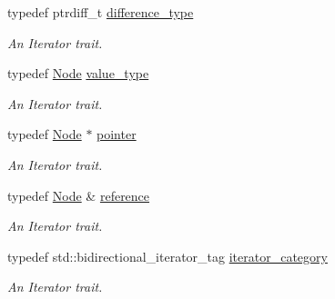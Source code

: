 \begin{DoxyCompactItemize}
\item 
\hypertarget{classphys_1_1xml_1_1NodeIterator_a0d7f40ce76602a5cc74616545d5c6076}{
typedef ptrdiff\_\-t \hyperlink{classphys_1_1xml_1_1NodeIterator_a0d7f40ce76602a5cc74616545d5c6076}{difference\_\-type}}
\label{da/d4f/classphys_1_1xml_1_1NodeIterator_a0d7f40ce76602a5cc74616545d5c6076}

\begin{DoxyCompactList}\small\item\em An Iterator trait. \item\end{DoxyCompactList}\item 
\hypertarget{classphys_1_1xml_1_1NodeIterator_a41a1bf31ea149a9a58d60c52e24234ab}{
typedef \hyperlink{classphys_1_1xml_1_1Node}{Node} \hyperlink{classphys_1_1xml_1_1NodeIterator_a41a1bf31ea149a9a58d60c52e24234ab}{value\_\-type}}
\label{da/d4f/classphys_1_1xml_1_1NodeIterator_a41a1bf31ea149a9a58d60c52e24234ab}

\begin{DoxyCompactList}\small\item\em An Iterator trait. \item\end{DoxyCompactList}\item 
\hypertarget{classphys_1_1xml_1_1NodeIterator_ad50b430887341d1cad3a655f5363c2e2}{
typedef \hyperlink{classphys_1_1xml_1_1Node}{Node} $\ast$ \hyperlink{classphys_1_1xml_1_1NodeIterator_ad50b430887341d1cad3a655f5363c2e2}{pointer}}
\label{da/d4f/classphys_1_1xml_1_1NodeIterator_ad50b430887341d1cad3a655f5363c2e2}

\begin{DoxyCompactList}\small\item\em An Iterator trait. \item\end{DoxyCompactList}\item 
\hypertarget{classphys_1_1xml_1_1NodeIterator_a7e9f8c536d367f3d9af80ee0b749e36f}{
typedef \hyperlink{classphys_1_1xml_1_1Node}{Node} \& \hyperlink{classphys_1_1xml_1_1NodeIterator_a7e9f8c536d367f3d9af80ee0b749e36f}{reference}}
\label{da/d4f/classphys_1_1xml_1_1NodeIterator_a7e9f8c536d367f3d9af80ee0b749e36f}

\begin{DoxyCompactList}\small\item\em An Iterator trait. \item\end{DoxyCompactList}\item 
\hypertarget{classphys_1_1xml_1_1NodeIterator_abf077d34ecc13ff336f87a18a6d0fa09}{
typedef std::bidirectional\_\-iterator\_\-tag \hyperlink{classphys_1_1xml_1_1NodeIterator_abf077d34ecc13ff336f87a18a6d0fa09}{iterator\_\-category}}
\label{da/d4f/classphys_1_1xml_1_1NodeIterator_abf077d34ecc13ff336f87a18a6d0fa09}

\begin{DoxyCompactList}\small\item\em An Iterator trait. \item\end{DoxyCompactList}\end{DoxyCompactItemize}
